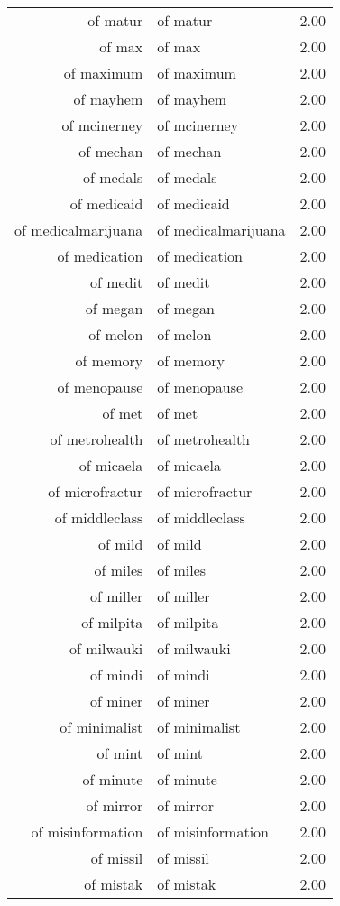 \begin{table}[ht]
\begin{tabular}{rlr}
  of matur & of matur & 2.00 \\ 
  of max & of max & 2.00 \\ 
  of maximum & of maximum & 2.00 \\ 
  of mayhem & of mayhem & 2.00 \\ 
  of mcinerney & of mcinerney & 2.00 \\ 
  of mechan & of mechan & 2.00 \\ 
  of medals & of medals & 2.00 \\ 
  of medicaid & of medicaid & 2.00 \\ 
  of medicalmarijuana & of medicalmarijuana & 2.00 \\ 
  of medication & of medication & 2.00 \\ 
  of medit & of medit & 2.00 \\ 
  of megan & of megan & 2.00 \\ 
  of melon & of melon & 2.00 \\ 
  of memory & of memory & 2.00 \\ 
  of menopause & of menopause & 2.00 \\ 
  of met & of met & 2.00 \\ 
  of metrohealth & of metrohealth & 2.00 \\ 
  of micaela & of micaela & 2.00 \\ 
  of microfractur & of microfractur & 2.00 \\ 
  of middleclass & of middleclass & 2.00 \\ 
  of mild & of mild & 2.00 \\ 
  of miles & of miles & 2.00 \\ 
  of miller & of miller & 2.00 \\ 
  of milpita & of milpita & 2.00 \\ 
  of milwauki & of milwauki & 2.00 \\ 
  of mindi & of mindi & 2.00 \\ 
  of miner & of miner & 2.00 \\ 
  of minimalist & of minimalist & 2.00 \\ 
  of mint & of mint & 2.00 \\ 
  of minute & of minute & 2.00 \\ 
  of mirror & of mirror & 2.00 \\ 
  of misinformation & of misinformation & 2.00 \\ 
  of missil & of missil & 2.00 \\ 
  of mistak & of mistak & 2.00 \\ 

\end{tabular}
\end{table}
